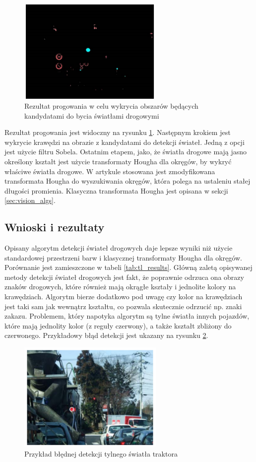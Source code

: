 \begin{figure}
  \centering
  \includegraphics[width=7cm]{img/tl_thresh.png}
  \caption{Rezultat progowania w celu wykrycia obszarów będących kandydatami do bycia światłami drogowymi\cite{T4}}
  \label{fig:tl_thresh}
\end{figure}

Rezultat progowania jest widoczny na rysunku \ref{fig:tl_thresh}. Następnym krokiem jest wykrycie krawędzi na obrazie z kandydatami do detekcji świateł. Jedną z opcji jest użycie filtru Sobela. Ostatnim etapem, jako, że światła drogowe mają jasno określony kształt jest użycie transformaty Hougha dla okręgów, by wykryć właściwe światła drogowe. W artykule stosowana jest zmodyfikowana transformata Hougha do wyszukiwania okręgów, która polega na ustaleniu stałej długości promienia. Klasyczna transformata Hougha jest opisana w sekcji \ref{sec:vision_algs}.

\subsection{Wnioski i rezultaty}
Opisany algorytm detekcji świateł drogowych daje lepsze wyniki niż użycie standardowej przestrzeni barw i klasycznej transformaty Hougha dla okręgów. Porównanie jest zamieszczone w tabeli \ref{tab:tl_results}. Główną zaletą opisywanej metody detekcji świateł drogowych jest fakt, że poprawnie odrzuca ona obrazy znaków drogowych, które również mają okrągłe kształy i jednolite kolory na krawędziach. Algorytm bierze dodatkowo pod uwagę czy kolor na krawędziach jest taki sam jak wewnątrz kształtu, co pozwala skutecznie odrzucić np. znaki zakazu.
Problemem, który napotyka algorytm są tylne światła innych pojazdów, które mają jednolity kolor (z reguły czerwony), a także kształt zbliżony do czerwonego. Przykładowy błąd detekcji jest ukazany na rysunku \ref{fig:tl_err}.

\begin{figure}
  \centering
  \includegraphics[width=7cm]{img/tl_err.png}
  \caption{Przykład błędnej detekcji tylnego światła traktora\cite{T4}}
  \label{fig:tl_err}
\end{figure}

